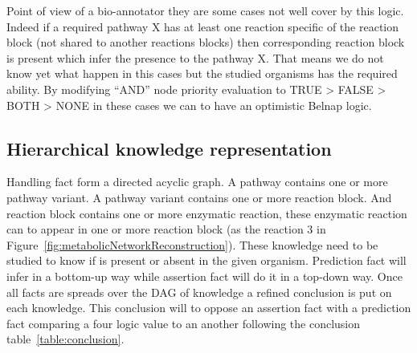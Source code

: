 \documentclass{llncs}
\begin{document}
Point of view of a bio-annotator they are some cases not well cover by this logic. Indeed if a required pathway X has at least one reaction specific of the reaction block (not shared to another reactions blocks) then corresponding reaction block is present which infer the presence to the pathway X. That means we do not know yet what happen in this cases but the studied organisms has the required ability. By modifying ``AND'' node priority evaluation to TRUE > FALSE > BOTH > NONE in these cases we can to have an optimistic Belnap logic.

\subsection{Hierarchical knowledge representation}
Handling fact form a directed acyclic graph. A pathway contains one or more pathway variant. A pathway variant contains one or more reaction block. And reaction block contains one or more enzymatic reaction, these enzymatic reaction can to appear in one or more reaction block (as the reaction 3 in Figure~\ref{fig:metabolicNetworkReconstruction}). These knowledge need to be studied to know if is present or absent in the given organism.
Prediction fact will infer in a bottom-up way while assertion fact will do it in a top-down way. Once all facts are spreads over the DAG of knowledge a refined conclusion is put on each knowledge. This conclusion will to oppose an assertion fact with a prediction fact comparing a four logic value to an another following the conclusion table~\ref{table:conclusion}.
\end{document}
